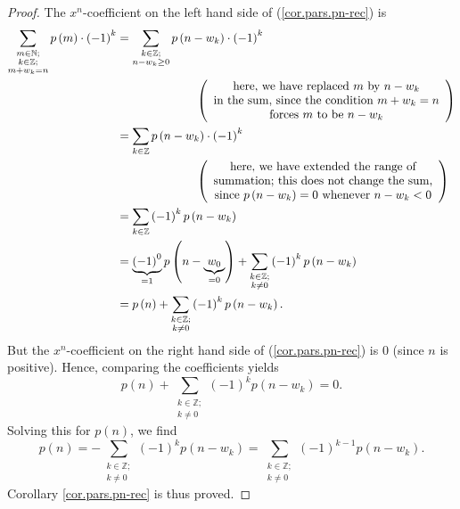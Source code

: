 \begin{proof}
The $x^{n}$-coefficient on the left hand side of (\ref{cor.pars.pn-rec}) is%
\begin{align*}
\sum_{\substack{m\in\mathbb{N};\\k\in\mathbb{Z};\\m+w_{k}=n}}p\left(
m\right)  \cdot\left(  -1\right)  ^{k}  &  =\sum_{\substack{k\in
\mathbb{Z};\\n-w_{k}\geq0}}p\left(  n-w_{k}\right)  \cdot\left(  -1\right)
^{k}\\
&  \ \ \ \ \ \ \ \ \ \ \ \ \ \ \ \ \ \ \ \ \left(
\begin{array}
[c]{c}%
\text{here, we have replaced }m\text{ by }n-w_{k}\\
\text{in the sum, since the condition }m+w_{k}=n\\
\text{forces }m\text{ to be }n-w_{k}%
\end{array}
\right) \\
&  =\sum_{k\in\mathbb{Z}}p\left(  n-w_{k}\right)  \cdot\left(  -1\right)
^{k}\\
&  \ \ \ \ \ \ \ \ \ \ \ \ \ \ \ \ \ \ \ \ \left(
\begin{array}
[c]{c}%
\text{here, we have extended the range of}\\
\text{summation; this does not change the sum,}\\
\text{since }p\left(  n-w_{k}\right)  =0\text{ whenever }n-w_{k}<0
\end{array}
\right) \\
&  =\sum_{k\in\mathbb{Z}}\left(  -1\right)  ^{k}p\left(  n-w_{k}\right) \\
&  =\underbrace{\left(  -1\right)  ^{0}}_{=1}p\left(  n-\underbrace{w_{0}%
}_{=0}\right)  +\sum_{\substack{k\in\mathbb{Z};\\k\neq0}}\left(  -1\right)
^{k}p\left(  n-w_{k}\right) \\
&  =p\left(  n\right)  +\sum_{\substack{k\in\mathbb{Z};\\k\neq0}}\left(
-1\right)  ^{k}p\left(  n-w_{k}\right)  .
\end{align*}
But the $x^{n}$-coefficient on the right hand side of (\ref{cor.pars.pn-rec})
is $0$ (since $n$ is positive). Hence, comparing the coefficients yields
\[
p\left(  n\right)  +\sum_{\substack{k\in\mathbb{Z};\\k\neq0}}\left(
-1\right)  ^{k}p\left(  n-w_{k}\right)  =0.
\]
Solving this for $p\left(  n\right)  $, we find%
\[
p\left(  n\right)  =-\sum_{\substack{k\in\mathbb{Z};\\k\neq0}}\left(
-1\right)  ^{k}p\left(  n-w_{k}\right)  =\sum_{\substack{k\in\mathbb{Z}%
;\\k\neq0}}\left(  -1\right)  ^{k-1}p\left(  n-w_{k}\right)  .
\]
Corollary \ref{cor.pars.pn-rec} is thus proved.
\end{proof}


